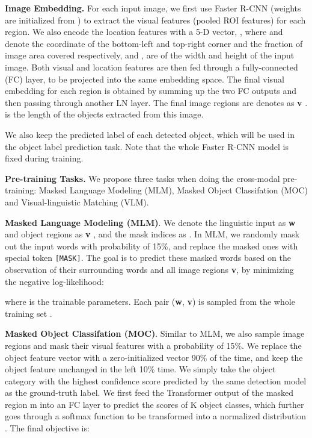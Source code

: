 \documentclass[letterpaper]{article} \usepackage{aaai20}  \usepackage{times}  \usepackage{helvet} \usepackage{courier}  \usepackage[hyphens]{url}  \usepackage{graphicx} \urlstyle{rm} \def\UrlFont{\rm}  \usepackage{graphicx}  \frenchspacing  \setlength{\pdfpagewidth}{8.5in}  \setlength{\pdfpageheight}{11in}  \usepackage{amssymb}
\begin{document}
\textbf{Image Embedding.} For each input image, we first use Faster R-CNN (weights are initialized from \cite{singh2018pythia}) to extract the visual features (pooled ROI features) for each region. We also encode the location features with a 5-D vector, , where  and  denote the coordinate of the bottom-left and top-right corner and the fraction of image area covered respectively, and ,  are of the width and height of the input image. Both visual and location features are then fed through a fully-connected (FC) layer, to be projected into the same embedding space. The final visual embedding for each region is obtained by summing up the two FC outputs and then passing through another LN layer. The final image regions are denotes as \textbf{v} .  is the length of the objects extracted from this image.

We also keep the predicted label of each detected object, which will be used in the object label prediction task. Note that the whole Faster R-CNN model is fixed during training. 

\textbf{Pre-training Tasks.} We propose three tasks when doing the cross-modal pre-training: Masked Language Modeling (MLM), Masked Object Classifation (MOC) and Visual-linguistic Matching (VLM). 

\textbf{Masked Language Modeling (MLM)}. We denote the linguistic input as \textbf{w}  and object regions as \textbf{v} , and the mask indices as . In MLM, we randomly mask out the input words with probability of 15\%, and replace the masked ones  with special token \texttt{[MASK]}. The goal is to predict these masked words based on the observation of their surrounding words  and all image regions \textbf{v}, by minimizing the negative log-likelihood:

where  is the trainable parameters. Each pair (\textbf{w}, \textbf{v}) is sampled from the whole training set .

\textbf{Masked Object Classifation (MOC)}. Similar to MLM, we also sample image regions and mask their visual features with a probability of 15\%. We replace the object feature vector with a zero-initialized vector  90\% of the time, and keep the object feature unchanged in the left 10\% time. We simply take the object category with the highest confidence score predicted by the same detection model as the ground-truth label. We first feed the Transformer output of the masked region 
m into an FC layer
to predict the scores of K object classes, which further goes through a softmax function to be transformed into a normalized distribution .  The final objective is:
\end{document}

